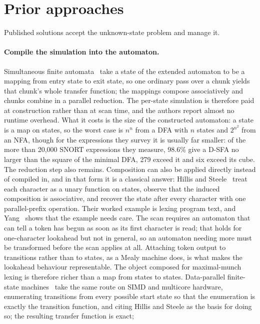\documentclass[11pt,a4paper]{article}
\theoremstyle{definition}
\theoremstyle{plain}
\begin{document}
\section{Prior approaches}
\label{sec:prior}

Published solutions accept the unknown-state problem and manage it.

\paragraph{Compile the simulation into the automaton.} Simultaneous finite automata~\cite{sinya2013sfa} take a state
of the extended automaton to be a mapping from entry state to exit state, so one ordinary pass over a chunk yields
that chunk's whole transfer function; the mappings compose associatively and chunks combine in a parallel reduction.
The per-state simulation is therefore paid at construction rather than at scan time, and the authors report almost no
runtime overhead. What it costs is the size of the constructed automaton: a state is a map on states, so the worst
case is $n^n$ from a DFA with $n$ states and $2^{n^2}$ from an NFA, though for the expressions they survey it is
usually far smaller: of the more than 20,000 SNORT expressions they measure, 98.6\% give a D-SFA no larger than the
square of the minimal DFA, 279 exceed it and six exceed its cube. The reduction step also remains. Composition can
also be applied directly instead of compiled in, and in that form it is a classical answer: Hillis and
Steele~\cite{hillis1986dataparallel} treat each character as a unary function on states, observe that the induced
composition is associative, and recover the state after every character with one parallel-prefix operation. Their
worked example is lexing program text, and Yang~\cite{yang1996mealy} shows that the example needs care. The scan
requires an automaton that can tell a token has begun as soon as its first character is read; that holds for
one-character lookahead but not in general, so an automaton needing more must be transformed before the scan applies
at all. Attaching token output to transitions rather than to states, as a Mealy machine does, is what makes the
lookahead behaviour representable. The object composed for maximal-munch lexing is therefore richer than a map from
states to states. Data-parallel finite-state machines~\cite{mytkowicz2014dpfsm} take the same route on SIMD and
multicore hardware, enumerating transitions from every possible start state so that the enumeration is exactly the
transition function, and citing Hillis and Steele as the basis for doing so; the resulting transfer function is exact;
\end{document}
